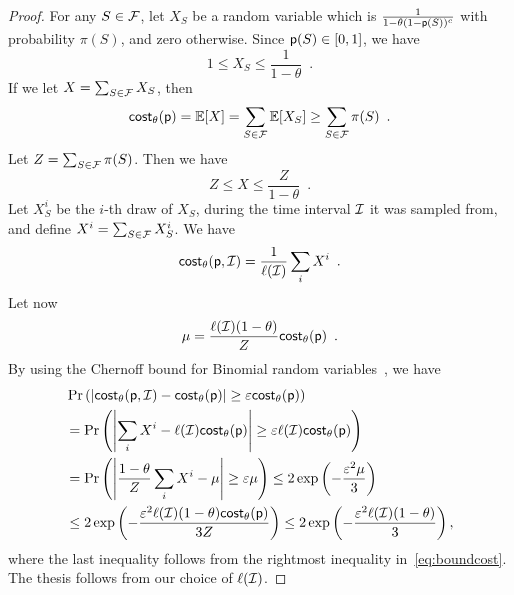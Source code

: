 \begin{proof}
	For any $S\in\mathcal{F}$, let $X_S$ be a random variable which is
	$\frac{1}{1-\theta(1-\mathsf{p}(S))^c}$ with probability $\pi(S)$, and zero
	otherwise. Since $\mathsf{p}(S)\in [0,1]$, we have
	\[
		1\leq X_S \leq \frac{1}{1-\theta}\enspace.
	\]
	If we let $X = \sum_{S\in \mathcal{F}} X_S$, then
	\begin{equation}\label{eq:boundcost}
		\mathsf{cost}_\theta(\mathsf{p}) = \mathbb{E}[X] = \sum_{S\in\mathcal{F}} \mathbb{E}[X_{S}]
		\geq \sum_{S\in\mathcal{F}}\pi(S)\enspace.
	\end{equation}
	Let $Z=\sum_{S\in\mathcal{F}}\pi(S)$. Then we have
	\[
		Z \leq X \leq \frac{Z}{1-\theta}\enspace.
	\]
	Let $X^i_S$ be the $i$-th draw of $X_S$, during the time interval $\mathcal{I}$ it
	was sampled from, and define $X^i = \sum_{S\in\mathcal{F}}X_S^i$. We have
	\[
		\mathsf{cost}_\theta(\mathsf{p},\mathcal{I}) =
		\frac{1}{\ell(\mathcal{I})}\sum_{i}X^i\enspace.
	\]
	Let now
	\[
		\mu=\frac{\ell(\mathcal{I})(1-\theta)}{Z}\mathsf{cost}_\theta(\mathsf{p})\enspace.
	\]
	By using the Chernoff bound for Binomial random
	variables~\citep[Corol.~4.6]{MitzenmacherU05}, we have
	\begin{align*}
		&\Pr\left(\left|\mathsf{cost}_\theta(\mathsf{p},\mathcal{I}) - \mathsf{cost}_\theta(\mathsf{p})\right| \geq \varepsilon
		\mathsf{cost}_\theta(\mathsf{p})\right)\\
		&=\Pr\left(\left|\sum_i X^i - \ell(\mathcal{I})\mathsf{cost}_\theta(\mathsf{p})\right| \geq \varepsilon
		\ell(\mathcal{I}) \mathsf{cost}_\theta(\mathsf{p})\right) \\
		&= \Pr\left(\left|\frac{1-\theta}{Z}\sum_i X^i - \mu\right| \geq \varepsilon
		\mu\right) \leq 2\exp\left(-\frac{\varepsilon^2\mu}{3}\right)\\
		&\le 2\exp\left(-\frac{\varepsilon^2 \ell(\mathcal{I}) (1-\theta)
			\mathsf{cost}_\theta(\mathsf{p})}{3Z}\right) \leq 2\exp\left(-\frac{\varepsilon^2 \ell(\mathcal{I}) (1-\theta)}{3}\right),
	\end{align*}
	where the last inequality follows from the rightmost inequality
	in~\eqref{eq:boundcost}. The thesis follows from our choice of
	$\ell(\mathcal{I})$.
\end{proof}

